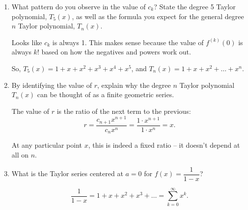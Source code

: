 \begin{enumerate}[leftmargin=0pt]
\begin{enumerate}
    \item What pattern do you observe in the value of $c_k$? State the degree 5 Taylor polynomial, $T_5(x)$, as well as the formula you expect for the general degree $n$ Taylor polynomial, $T_n(x)$.
    
    \begin{red}
    Looks like $c_k$ is always 1. This makes sense because the value of $f^{(k)}(0)$ is always $k!$ based on how the negatives and powers work out.

    So, $T_5(x) = 1 + x + x^2 + x^3 + x^4 + x^5$, and $T_n(x) = 1 + x + x^2 + \ldots + x^n$. 
    \end{red}
    
    \item By identifying the value of $r$, explain why the degree $n$ Taylor polynomial $T_n(x)$ can be thought of as a finite geometric series.
    
    \begin{red}
    The value of $r$ is the ratio of the next term to the previous:
    \[r = \dfrac{c_{n+1}x^{n+1}}{c_n{x^n}} = \dfrac{1\cdot x^{n+1}}{1\cdot x^n} = x.\]

    At any particular point $x$, this is indeed a fixed ratio -- it doesn't depend at all on $n$.
    \end{red}

    \item What is the Taylor series centered at $a=0$ for $f(x) = \dfrac{1}{1-x}$?

    \begin{red}
        \[
        \dfrac{1}{1-x} = 1 + x + x^2 + x^3 + \ldots = \sum_{k=0}^{\infty} x^k.
        \]
    \end{red}
\end{enumerate}


\end{enumerate}
